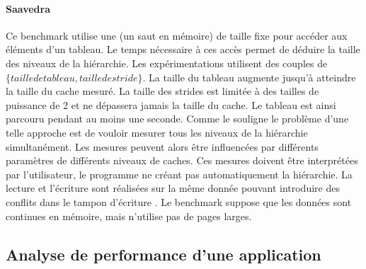         \paragraph{Saavedra \cite{Saavedra1995}} 
        
            Ce benchmark utilise une  (un saut en mémoire) de taille fixe pour accéder aux éléments d'un tableau. Le temps nécessaire à ces accès permet de déduire la taille des niveaux de la hiérarchie. Les expérimentations utilisent des couples de $\{taille de tableau, taille de stride\}$. La taille du tableau augmente jusqu'à atteindre la taille du cache mesuré. La taille des strides est limitée à des tailles de puissance de 2 et ne dépassera jamais la taille du cache. Le tableau est ainsi parcouru pendant au moins une seconde. Comme le souligne \cite{Yotov2005} le problème d'une telle approche est de vouloir mesurer tous les niveaux de la hiérarchie simultanément. Les mesures peuvent alors être influencées par différents paramètres de différents niveaux de caches. Ces mesures doivent être interprétées par l'utilisateur, le programme ne créant pas automatiquement la hiérarchie. La lecture et l'écriture sont réalisées sur la même donnée pouvant introduire des conflits dans le tampon d'écriture  \cite{Yotov2005}. Le benchmark suppose que les données sont continues en mémoire, mais n'utilise pas de pages larges.

       
\subsection{Analyse de performance d'une application}\label{sec:profiling}

